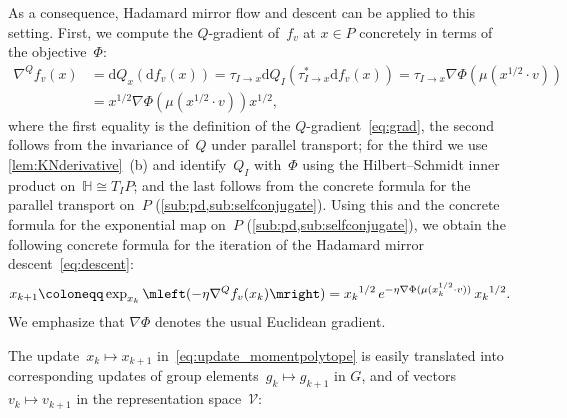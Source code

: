 \documentclass[11pt,letterpaper]{article}
\numberwithin{equation}{section}
\newcommand{\bbH}{\mathbb{H}}
\newcommand{\diff}{\mathrm{d}}
\newcommand{\VV}{\mathcal{V}}
\begin{document}
As a consequence, Hadamard mirror flow and descent can be applied to this setting.
First, we compute the $Q$-gradient of~$f_v$ at $x\in P$ concretely in terms of the objective~$\Phi$:
\begin{equation}\label{eq:concrete qgrad}
\begin{aligned}
    \nabla^Q f_v(x)
&= \diff Q_{x}(\diff f_v(x))
= \tau_{I\to x} \diff Q_I(\tau_{I \to x}^* \diff f_v(x))
= \tau_{I\to x} \nabla \Phi(\mu(x^{1/2} \cdot v)) \\
&= x^{1/2} \nabla \Phi(\mu(x^{1/2} \cdot v)) x^{1/2},
\end{aligned}
\end{equation}
where the first equality is the definition of the $Q$-gradient~\eqref{eq:grad},
the second follows from the invariance of~$Q$ under parallel transport;
for the third we use \cref{lem:KNderivative}~(b) and identify~$Q_I$ with~$\Phi$ using the Hilbert--Schmidt inner product on~$\bbH\cong T_IP$;
and the last follows from the concrete formula for the parallel transport on~$P$ (\cref{sub:pd,sub:selfconjugate}).
Using this and the concrete formula for the exponential map on~$P$ (\cref{sub:pd,sub:selfconjugate}), we obtain the following concrete formula for the iteration of the Hadamard mirror descent~\eqref{eq:descent}:
\begin{align}
\label{eq:update_momentpolytope}
    x_{k+1}
\coloneqq \exp_{x_k}\mleft(-\eta\nabla^Q f_v(x_k)\mright)
= {x_k}^{1/2} \, e^{-\eta \nabla \Phi(\mu(x_k^{1/2} \cdot v))} \, {x_k}^{1/2}.
\end{align}
We emphasize that $\nabla \Phi$ denotes the usual Euclidean gradient.

The update~$x_k \mapsto x_{k+1}$ in~\eqref{eq:update_momentpolytope} is easily translated into corresponding updates of group elements~$g_k \mapsto g_{k+1}$ in $G$, and of vectors $v_k \mapsto v_{k+1}$ in the representation space~$\VV$:
\end{document}
